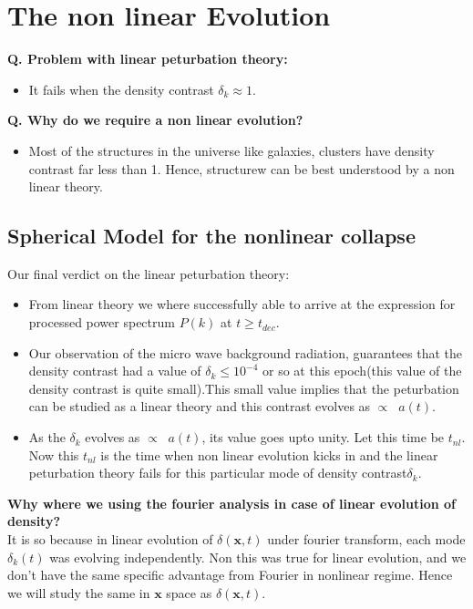 \documentclass[12pt]{report}
\newcommand{\mbf}[1]{\mathbf{#1}}
\newcommand{\tbf}[1]{\textbf{#1}}
\begin{document}
\chapter{The non linear Evolution}
\tbf{Q. Problem with linear peturbation theory:}
\begin{itemize}
\item It fails when the density contrast $\delta_k \approx 1$.
\end{itemize}
\tbf{Q. Why do we require a non linear evolution?}\\
\begin{itemize}
\item Most of the structures in the universe like galaxies, clusters have density contrast far less than 1. Hence, structurew can be best understood by a non linear theory.
\end{itemize}
\section{Spherical Model for the nonlinear collapse}
Our final verdict on the linear peturbation theory:
\begin{itemize}
\item From linear theory we where successfully able to arrive at the expression for processed power spectrum $P(k)$ at $t\geq t_{dec}$.
\item Our observation of the micro wave background radiation, guarantees that the density contrast had a value of $\delta_k \leq 10^{-4}$ or so at this epoch(this value of the density contrast is quite small).This small value implies that the peturbation can be studied as a linear theory and  this contrast evolves as $\propto \;\; a(t)$.
\item As the $\delta_k$ evolves as $\propto \;\; a(t) $, its value goes upto unity. Let this time be $t_{nl}$. Now this $t_{nl}$ is the time when non linear evolution kicks in and the linear peturbation theory fails for this particular mode of density contrast$\delta_k$.
\end{itemize} 
\tbf{Why where we using the fourier analysis in case of linear evolution of density?}\\

It is so because in linear evolution of $\delta(\mbf{x},t)$ under fourier transform, each mode $\delta_k(t)$ was evolving independently. Non this was true for linear evolution, and we don't have the same specific advantage from Fourier in nonlinear regime. Hence we will study the same in $\mbf{x}$ space as $\delta(\mbf{x},t)$.\\
\end{document}
